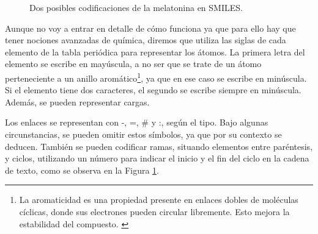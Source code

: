 \begin{figure}[H]
\centering
    \caption{Dos posibles codificaciones de la melatonina en SMILES. \cite{smiles_wikipedia}}
    \label{fig:ciclos-smiles}
\end{figure}

Aunque no voy a entrar en detalle de cómo funciona ya que para ello hay que tener nociones avanzadas de química, diremos que utiliza las siglas de cada elemento de la tabla periódica para representar los átomos. La primera letra del elemento se escribe en mayúscula, a no ser que se trate de un átomo perteneciente a un anillo aromático\footnote{La aromaticidad es una propiedad presente en enlaces dobles de moléculas cíclicas, donde sus electrones pueden circular libremente. Esto mejora la estabilidad del compuesto. \cite{aromaticidad, aromaticidad_wikipedia}}, ya que en ese caso se escribe en minúscula. Si el elemento tiene dos caracteres, el segundo se escribe siempre en minúscula. Además, se pueden representar cargas.

Los enlaces se representan con -, =, \# y :, según el tipo. Bajo algunas circunstancias, se pueden omitir estos símbolos, ya que por su contexto se deducen. También se pueden codificar ramas, situando elementos entre paréntesis, y ciclos, utilizando un número para indicar el inicio y el fin del ciclo en la cadena de texto, como se observa en la Figura \ref{fig:ciclos-smiles}. \cite{weininger1988smiles}

